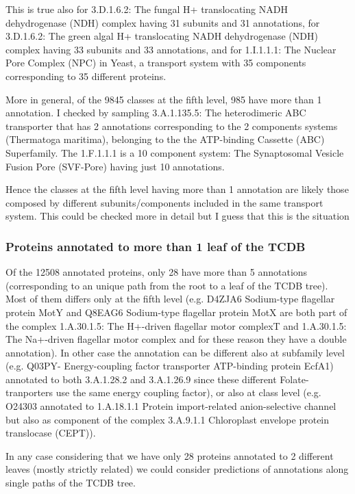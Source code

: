 \documentclass[english]{article}
\begin{document}
This is true also for 3.D.1.6.2: The fungal H+ translocating NADH dehydrogenase (NDH) complex having 31 subunits and 31 annotations, for 3.D.1.6.2: The green algal H+ translocating NADH dehydrogenase (NDH) complex having 33 subunits and 33 annotations, and for 1.I.1.1.1: The Nuclear Pore Complex (NPC) in Yeast, a transport system with 35 components corresponding to 35 different proteins.

More in general, of the 9845 classes at the fifth level, 985 have more than 1 annotation. I checked by sampling 3.A.1.135.5: The heterodimeric ABC transporter that has 2 annotations corresponding to the 2 components systems (Thermatoga maritima), belonging to the  the ATP-binding Cassette (ABC) Superfamily. The 1.F.1.1.1 is a 10 component system: The Synaptosomal Vesicle Fusion Pore (SVF-Pore) having just 10 annotations. 

 Hence the classes at the fifth level having more than 1 annotation are likely those composed by different subunits/components included in the same transport system. This could be checked more in detail but I guess that this is the situation

\subsubsection{Proteins annotated to more than 1 leaf of the TCDB}
 Of the  12508 annotated proteins, only  28 have more than 5 annotations (corresponding to an unique path from the root to a leaf of the TCDB tree).
Most of them differs only at the fifth level (e.g. D4ZJA6 	Sodium-type flagellar protein MotY and  Q8EAG6 	Sodium-type flagellar protein MotX are both part of the complex
1.A.30.1.5: The H+-driven flagellar motor complexT and 1.A.30.1.5: The Na+-driven flagellar motor complex and for these reason they have a double annotation).
In other case the annotation can be different also at subfamily level (e.g.  Q03PY- Energy-coupling factor transporter ATP-binding protein EcfA1) annotated to both 3.A.1.28.2 and  3.A.1.26.9 since these different Folate-tranporters use the same energy coupling factor), or also at class level (e.g. O24303 annotated to  1.A.18.1.1 Protein import-related anion-selective channel but also as component of the complex  3.A.9.1.1 Chloroplast envelope protein translocase (CEPT)).

In any case considering that we have only 28 proteins annotated to 2 different leaves (mostly strictly related) we could consider predictions of annotations along single paths of the TCDB tree.
\end{document}
